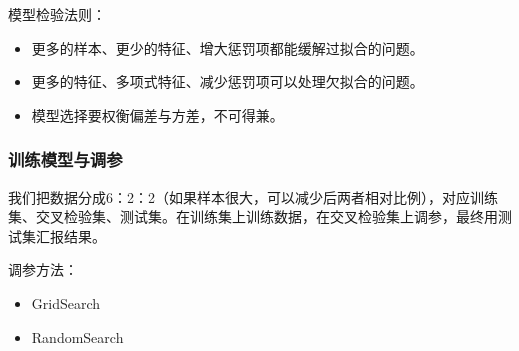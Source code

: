 \documentclass[UTF8,a4paper,12pt, onecolumn]{ctexart}
\begin{document}
模型检验法则：
\begin{itemize}
  \item 更多的样本、更少的特征、增大惩罚项都能缓解过拟合的问题。
  \item 更多的特征、多项式特征、减少惩罚项可以处理欠拟合的问题。
  \item 模型选择要权衡偏差与方差，不可得兼。
\end{itemize}

\subsubsection{训练模型与调参}

我们把数据分成6：2：2（如果样本很大，可以减少后两者相对比例），对应训练集、交叉检验集、测试集。在训练集上训练数据，在交叉检验集上调参，最终用测试集汇报结果。

调参方法：
\begin{itemize}
  \item GridSearch
  \item RandomSearch
\end{itemize}




\appendix







\end{document}

